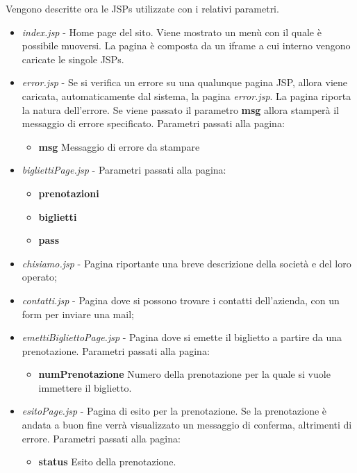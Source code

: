 \documentclass[a4paper,10pt]{article}
\begin{document}
Vengono descritte ora le JSPs utilizzate con i relativi parametri.

\begin{itemize}
 \item \textit{index.jsp} - Home page del sito. Viene mostrato un men\`u con il quale \`e possibile muoversi. La pagina \`e composta da un iframe a cui interno vengono
			    caricate le singole JSPs. 
			    
 \item \textit{error.jsp} - Se si verifica un errore su una qualunque pagina JSP, allora viene caricata, automaticamente dal 
			    sistema, la pagina \textit{error.jsp}. La pagina riporta la natura dell'errore. Se viene passato il parametro \textbf{msg} allora 
			    stamper\`a il messaggio di errore specificato. 
 			Parametri passati alla pagina:
			\begin{itemize}
			 \item \textbf{msg} Messaggio di errore da stampare
			\end{itemize}
			
 \item \textit{bigliettiPage.jsp} - 
 			Parametri passati alla pagina:
			\begin{itemize}
			 \item \textbf{prenotazioni}
			 \item \textbf{biglietti}
			 \item \textbf{pass}
			\end{itemize}
			
 \item \textit{chisiamo.jsp} - Pagina riportante una breve descrizione della societ\`a e del loro operato;
 
 \item \textit{contatti.jsp} - Pagina dove si possono trovare i contatti dell'azienda, con un form per inviare una mail;
 
 \item \textit{emettiBigliettoPage.jsp} - Pagina dove si emette il biglietto a partire da una prenotazione. 
 			Parametri passati alla pagina:
			\begin{itemize}
			 \item \textbf{numPrenotazione} Numero della prenotazione per la quale si vuole immettere il biglietto.
			\end{itemize}
			
 \item \textit{esitoPage.jsp} - Pagina di esito per la prenotazione. Se la prenotazione \`e andata a buon fine verr\`a visualizzato un messaggio di conferma,
				altrimenti di errore.
 			Parametri passati alla pagina:
			\begin{itemize}
			 \item \textbf{status} Esito della prenotazione.
			\end{itemize}
			

\end{itemize}
\end{document}
